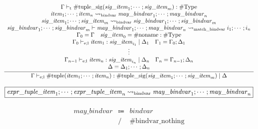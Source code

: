 \begin{gather*}
    \infer{\Gamma \vdash_{\mathrm{e}; \mathrm{l}} \mathrm{\#tuple}(\mathit{item}_1; \cdots; \mathit{item}_n): \mathrm{\#tuple\_sig}(\mathit{sig\_item}_1; \cdots; \mathit{sig\_item}_m) \mid \Delta}{
        \begin{array}{c}
            \Gamma \vdash_\mathrm{t} \mathrm{\#tuple\_sig}(\mathit{sig\_item}_1; \cdots; \mathit{sig\_item}_m): \mathrm{\#Type}
            \\
            \mathit{item}_1; \cdots; \mathit{item}_n \rightsquigarrow_\mathrm{bindvar} \mathit{may\_bindvar}_1; \cdots; \mathit{may\_bindvar}_n
            \\
            \mathit{sig\_item}_1; \cdots; \mathit{sig\_item}_m \rightsquigarrow_\mathrm{bindvar} \mathit{sig\_bindvar}_1; \cdots; \mathit{sig\_bindvar}_m
            \\
            \mathit{sig\_bindvar}_1; \cdots; \mathit{sig\_bindvar}_m \vdash \mathit{may\_bindvar}_1; \cdots; \mathit{may\_bindvar}_n \rightsquigarrow_\mathrm{match\_bindvar} i_1; \cdots; i_n
            \\
            \Gamma_0 = \Gamma
            \hspace{1em}
            \mathit{sig\_item}_0 = \mathrm{\#noname}: \mathrm{\#Type}
            \\
            \Gamma_0 \vdash_{\mathrm{e}; \mathrm{l}} \mathit{item}_1: \mathit{sig\_item}_{i_1} \mid \Delta_1
            \hspace{1em}
            \Gamma_1 = \Gamma_0; \Delta_1
            \\
            \vdots
            \\
            \Gamma_{n - 1} \vdash_{\mathrm{e}; \mathrm{l}} \mathit{item}_n: \mathit{sig\_item}_{i_n} \mid \Delta_n
            \hspace{1em}
            \Gamma_n = \Gamma_{n - 1}; \Delta_n
            \\
            \Delta = \Delta_1; \cdots; \Delta_n
        \end{array}
    }
\end{gather*}

$\fbox{$\mathit{expr\_tuple\_item}_1; \cdots; \mathit{expr\_tuple\_item}_n \rightsquigarrow_\mathrm{bindvar} \mathit{may\_bindvar}_1; \cdots; \mathit{may\_bindvar}_n$}$

\begin{align*}
    \begin{array}{rcll}
        \mathit{may\_bindvar}
        &\Coloneq &\mathit{bindvar} \\
        &\mathrel{/} &\mathrm{\#bindvar\_nothing} \\
    \end{array}
\end{align*}

